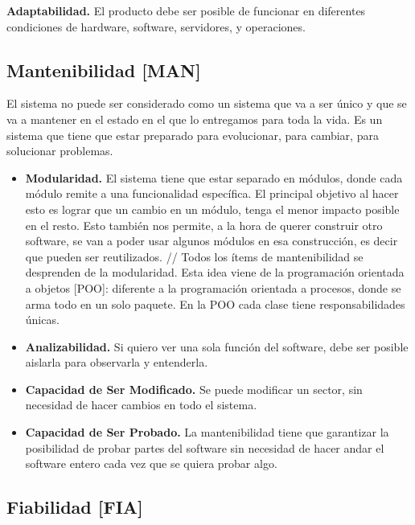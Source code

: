 \textbf{Adaptabilidad.} El producto debe ser posible de funcionar en
diferentes condiciones de hardware, software, servidores, y operaciones.

\hypertarget{mantenibilidad-man}{%
\subsection{Mantenibilidad {[}MAN{]}}\label{mantenibilidad-man}}

El sistema no puede ser considerado como un sistema que va a ser único y
que se va a mantener en el estado en el que lo entregamos para toda la
vida. Es un sistema que tiene que estar preparado para evolucionar, para
cambiar, para solucionar problemas.

\begin{itemize}

\item
  \textbf{Modularidad.} El sistema tiene que estar separado en módulos,
  donde cada módulo remite a una funcionalidad específica. El principal
  objetivo al hacer esto es lograr que un cambio en un módulo, tenga el
  menor impacto posible en el resto. Esto también nos permite, a la hora
  de querer construir otro software, se van a poder usar algunos módulos
  en esa construcción, es decir que pueden ser reutilizados. // Todos
  los ítems de mantenibilidad se desprenden de la modularidad. Esta idea
  viene de la programación orientada a objetos {[}POO{]}: diferente a la
  programación orientada a procesos, donde se arma todo en un solo
  paquete. En la POO cada clase tiene responsabilidades únicas.
\item
  \textbf{Analizabilidad.} Si quiero ver una sola función del software,
  debe ser posible aislarla para observarla y entenderla.
\item
  \textbf{Capacidad de Ser Modificado.} Se puede modificar un sector,
  sin necesidad de hacer cambios en todo el sistema.
\item
  \textbf{Capacidad de Ser Probado.} La mantenibilidad tiene que
  garantizar la posibilidad de probar partes del software sin necesidad
  de hacer andar el software entero cada vez que se quiera probar algo.
\end{itemize}

\hypertarget{fiabilidad-fia}{%
\subsection{Fiabilidad {[}FIA{]}}\label{fiabilidad-fia}}

